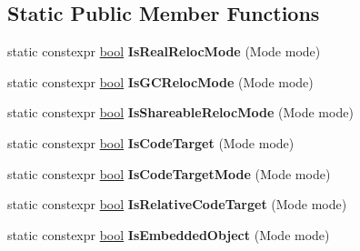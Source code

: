\subsection*{Static Public Member Functions}
\begin{DoxyCompactItemize}
\item 
\mbox{\label{classv8_1_1internal_1_1RelocInfo_a9f9a943d59c240474b61183dbffa1c6a}} 
static constexpr \mbox{\hyperlink{classbool}{bool}} {\bfseries Is\+Real\+Reloc\+Mode} (Mode mode)
\item 
\mbox{\label{classv8_1_1internal_1_1RelocInfo_a317d0543bf8b464ac0801f92eab3d176}} 
static constexpr \mbox{\hyperlink{classbool}{bool}} {\bfseries Is\+G\+C\+Reloc\+Mode} (Mode mode)
\item 
\mbox{\label{classv8_1_1internal_1_1RelocInfo_a3d4d465181ccdb6cdf4f1cef466fee93}} 
static constexpr \mbox{\hyperlink{classbool}{bool}} {\bfseries Is\+Shareable\+Reloc\+Mode} (Mode mode)
\item 
\mbox{\label{classv8_1_1internal_1_1RelocInfo_a6eaa68064d28ea7801633e34298bd163}} 
static constexpr \mbox{\hyperlink{classbool}{bool}} {\bfseries Is\+Code\+Target} (Mode mode)
\item 
\mbox{\label{classv8_1_1internal_1_1RelocInfo_a4826de2c62c03505c8cef4fdd868a2a4}} 
static constexpr \mbox{\hyperlink{classbool}{bool}} {\bfseries Is\+Code\+Target\+Mode} (Mode mode)
\item 
\mbox{\label{classv8_1_1internal_1_1RelocInfo_a47c051bc688dcb55f47c0d192a23ae4c}} 
static constexpr \mbox{\hyperlink{classbool}{bool}} {\bfseries Is\+Relative\+Code\+Target} (Mode mode)
\item 
\mbox{\label{classv8_1_1internal_1_1RelocInfo_a3958f027f1a75bba30fdf7f881d7aba1}} 
static constexpr \mbox{\hyperlink{classbool}{bool}} {\bfseries Is\+Embedded\+Object} (Mode mode)
\item 
\mbox{\label{classv8_1_1internal_1_1RelocInfo_ac604e62221b983e45bd81309f607524d}} 

\end{DoxyCompactItemize}
